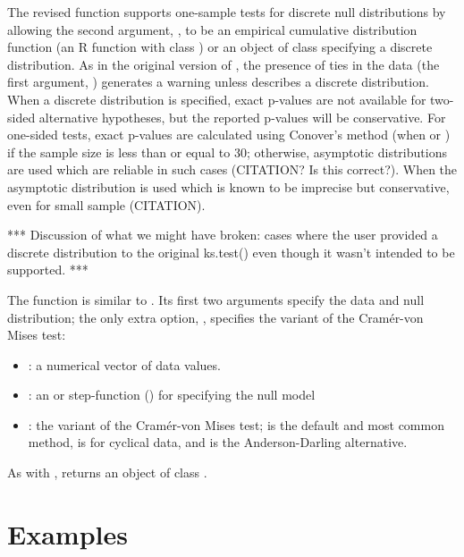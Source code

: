 The revised  function supports one-sample tests for discrete
null distributions by allowing the second argument, , to be
an empirical cumulative distribution function (an R function
with class ) or an object of class  specifying
a discrete distribution.  As in the original version of ,
the presence of ties in the data (the first argument, ) generates a
warning unless  describes a discrete distribution.  When a discrete
distribution is specified, exact p-values are not available for 
two-sided alternative hypotheses, but the reported p-values will be
conservative.  For one-sided tests,
exact p-values are calculated using Conover's
method (when  or )
if the sample size is less than or equal to 30; otherwise, asymptotic distributions
are used which are reliable in such cases (CITATION? Is this correct?).
When  the asymptotic distribution is used which is known
to be imprecise but conservative, even for small sample (CITATION).

*** Discussion of what we might have broken: cases where the user
provided a discrete distribution to the original ks.test() even though
it wasn't intended to be supported. ***

The function  is similar to .  Its first two
arguments specify the data and null distribution; the only extra option,
, specifies the variant of the Cram\'{e}r-von Mises test:
\begin{itemize}
\item {}: a numerical vector of data values.
\item {}: an  or step-function () for specifying
the null model
\item {}: the variant of the Cram\'{e}r-von Mises test; 
is the default and most common method,  is for cyclical data,
and  is the Anderson-Darling alternative.
\end{itemize}
As with ,  returns an object of class 
.

 




\section{Examples}

